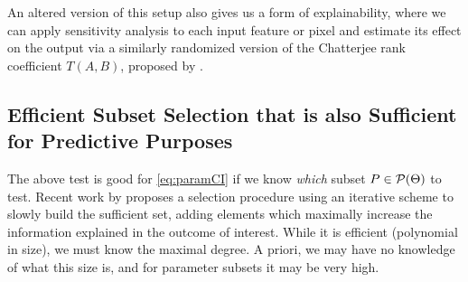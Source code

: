 \begin{remark}\label{rem:sens}
An altered version of this setup also gives us a form of explainability, where we can apply sensitivity analysis to each input feature or pixel and estimate its effect on the output via a similarly randomized version of the  Chatterjee rank coefficient $T(A,B)$, proposed by \cite{chatterjee2020new}.
\end{remark}




\subsection{Efficient Subset Selection that is also Sufficient for Predictive Purposes}
The above test is good for \eqref{eq:paramCI} if we know {\em which} subset $P\in \mathcal{P}(\Theta)$ to test. 
Recent work by \cite{bullseye} proposes a selection procedure using an iterative scheme to slowly build the sufficient set, adding elements which maximally increase the information explained in the outcome of interest.
While it is efficient (polynomial in size), we must know the maximal degree. A priori, we may have no knowledge of what this size is, and for parameter subsets it may be very high.

